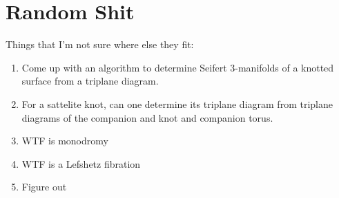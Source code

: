 \documentclass{amsart}
\theoremstyle{definition}
\begin{document}
\section{Random Shit}



Things that I'm not sure where else they fit:
\begin{enumerate}
\item Come up with an algorithm to determine Seifert 3-manifolds of a knotted surface from a triplane diagram.
\item For a sattelite knot, can one determine its triplane diagram from triplane diagrams of the companion and knot and companion torus.
\item WTF is monodromy
\item WTF is a Lefshetz fibration 
\item Figure out 
\end{enumerate}
\end{document}
